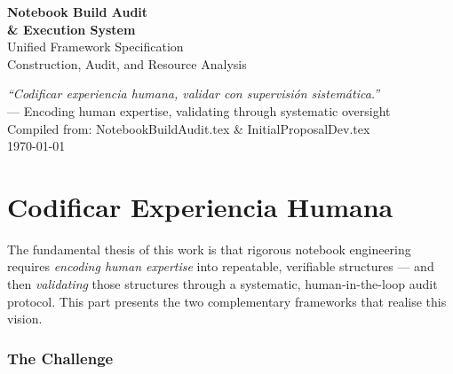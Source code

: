 \documentclass[11pt, a4paper]{article}
\begin{document}
\begin{titlepage}
  \centering
  \vspace*{3cm}

  {\Huge\bfseries Notebook Build Audit}\\[0.4cm]
  {\Huge\bfseries \& Execution System}\\[1cm]
  {\Large Unified Framework Specification}\\[0.5cm]
  {\large Construction, Audit, and Resource Analysis}\\[3cm]

  \vfill

  {\large\textit{``Codificar experiencia humana, validar con supervisión
  sistemática.''}}\\[0.3cm]
  {\footnotesize\color{clrGray} — Encoding human expertise, validating through
  systematic oversight}\\[2cm]

  {\footnotesize\color{clrGray} Compiled from: NotebookBuildAudit.tex \&
  InitialProposalDev.tex}\\[0.2cm]
  {\footnotesize\color{clrGray} \today}
  \vspace*{2cm}
\end{titlepage}

\newpage
\tableofcontents
\newpage

\part{Codificar Experiencia Humana}

The fundamental thesis of this work is that rigorous notebook engineering
requires \textit{encoding human expertise} into repeatable, verifiable
structures — and then \textit{validating} those structures through a
systematic, human-in-the-loop audit protocol. This part presents the two
complementary frameworks that realise this vision.

\section{The Challenge}
\end{document}
